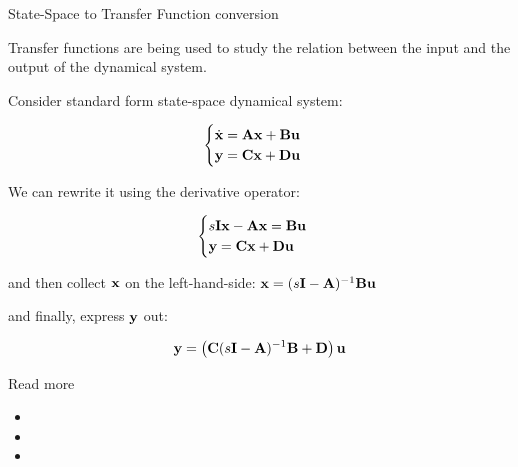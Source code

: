 \documentclass{beamer}
\begin{document}
\begin{frame}{State-Space to Transfer Function conversion}
\begin{flushleft}

Transfer functions are being used to study the relation between the input and the output of the dynamical system.

\bigskip

Consider standard form state-space dynamical system:

\begin{equation}
\begin{cases}
\dot{\mathbf{x}} = \mathbf{A}\mathbf{x} + \mathbf{B}\mathbf{u} \\
     \mathbf{y}  = \mathbf{C}\mathbf{x} + \mathbf{D}\mathbf{u}
\end{cases}
\end{equation}

We can rewrite it using the derivative operator:

\begin{equation}
\begin{cases}
s\mathbf{I}\mathbf{x} -\mathbf{A}\mathbf{x} = \mathbf{B}\mathbf{u} \\
\mathbf{y}  = \mathbf{C}\mathbf{x} + \mathbf{D}\mathbf{u}
\end{cases}
\end{equation}

and then collect $\mathbf{x}$ on the left-hand-side: $\mathbf{x} = (s\mathbf{I} -\mathbf{A})^{-1} \mathbf{B}\mathbf{u}$

and finally, express $\mathbf{y}$ out:

\begin{equation}
\mathbf{y}  = \left( \mathbf{C}(s\mathbf{I} -\mathbf{A})^{-1} \mathbf{B} + \mathbf{D} \right) \mathbf{u}
\end{equation}

\end{flushleft}
\end{frame}




\begin{frame}{Read more}

\begin{itemize}
\item {}

\item {}

\item {}

\end{itemize}

\end{frame}
\end{document}

